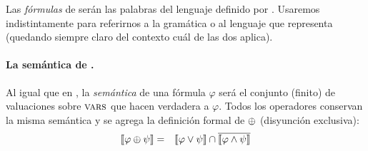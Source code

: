 Las {\em fórmulas} de \gramboolxor serán las palabras del lenguaje definido por \gramboolxor. Usaremos indistintamente \gramboolxor para referirnos a la gramática o al lenguaje que representa (quedando siempre claro del contexto cuál de las dos aplica).


\paragraph{La semántica de \gramboolxor.}

Al igual que en \grambool, la {\em semántica} de una fórmula $\varphi$ será el conjunto (finito) de valuaciones sobre $\textsc{vars}$ que hacen verdadera a $\varphi$. Todos los operadores conservan la misma semántica y se agrega la definición formal de $\oplus$ (disyunción exclusiva):
%
\begin{eqnarray*}
\llbracket \varphi\oplus\psi\rrbracket &=& \llbracket \varphi\vee\psi\rrbracket\cap \overline{\llbracket \varphi\wedge\psi\rrbracket}\\
\end{eqnarray*}








